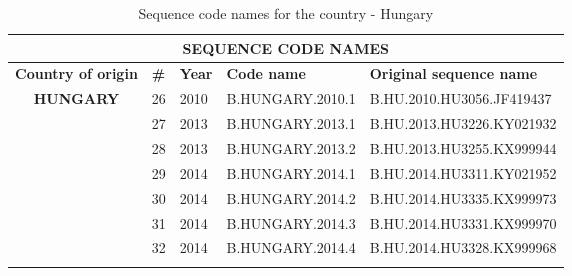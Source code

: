 \begin{table}[htbp]
    \caption{Sequence code names for the country - Hungary}
    \centering
\begin{tabular}{|cllll|}
\hline
\multicolumn{5}{|c|}{\textbf{SEQUENCE   CODE NAMES}}                                                                                                                                                         \\ \hline
\multicolumn{1}{|l|}{\textbf{Country   of origin}}       & \multicolumn{1}{l|}{\textbf{\#}} & \multicolumn{1}{r|}{\textbf{Year}} & \multicolumn{1}{l|}{\textbf{Code name}} & \textbf{Original sequence name} \\ \hline
\multicolumn{1}{|c|}{\multirow{11}{*}{\textbf{HUNGARY}}} & \multicolumn{1}{l|}{26}          & \multicolumn{1}{l|}{2010}          & \multicolumn{1}{l|}{B.HUNGARY.2010.1}   & B.HU.2010.HU3056.JF419437       \\ \cline{2-5} 
\multicolumn{1}{|c|}{}                                   & \multicolumn{1}{l|}{27}          & \multicolumn{1}{l|}{2013}          & \multicolumn{1}{l|}{B.HUNGARY.2013.1}   & B.HU.2013.HU3226.KY021932       \\ \cline{2-5} 
\multicolumn{1}{|c|}{}                                   & \multicolumn{1}{l|}{28}          & \multicolumn{1}{l|}{2013}          & \multicolumn{1}{l|}{B.HUNGARY.2013.2}   & B.HU.2013.HU3255.KX999944       \\ \cline{2-5} 
\multicolumn{1}{|c|}{}                                   & \multicolumn{1}{l|}{29}          & \multicolumn{1}{l|}{2014}          & \multicolumn{1}{l|}{B.HUNGARY.2014.1}   & B.HU.2014.HU3311.KY021952       \\ \cline{2-5} 
\multicolumn{1}{|c|}{}                                   & \multicolumn{1}{l|}{30}          & \multicolumn{1}{l|}{2014}          & \multicolumn{1}{l|}{B.HUNGARY.2014.2}   & B.HU.2014.HU3335.KX999973       \\ \cline{2-5} 
\multicolumn{1}{|c|}{}                                   & \multicolumn{1}{l|}{31}          & \multicolumn{1}{l|}{2014}          & \multicolumn{1}{l|}{B.HUNGARY.2014.3}   & B.HU.2014.HU3331.KX999970       \\ \cline{2-5} 
\multicolumn{1}{|c|}{}                                   & \multicolumn{1}{l|}{32}          & \multicolumn{1}{l|}{2014}          & \multicolumn{1}{l|}{B.HUNGARY.2014.4}   & B.HU.2014.HU3328.KX999968       \\ \cline{2-5} 

\end{tabular}
\end{table}

